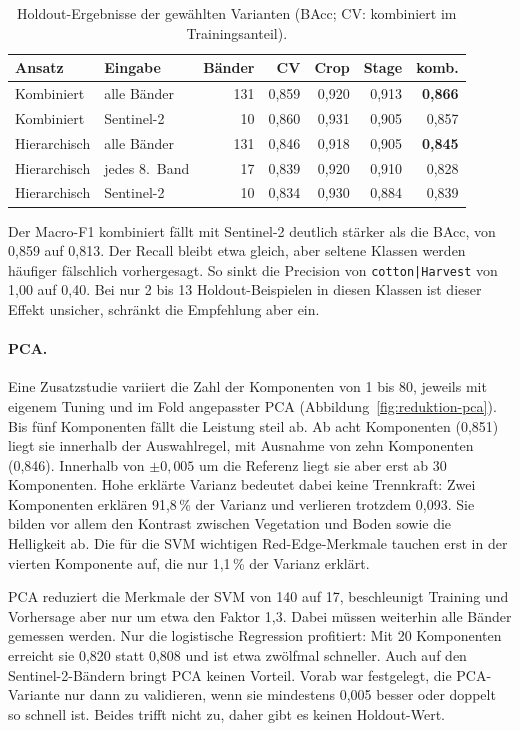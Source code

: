 \documentclass[11pt,a4paper,titlepage]{article}
\begin{document}
\begin{table}[H]
\centering
\caption{Holdout-Ergebnisse der gew\"ahlten Varianten (BAcc; CV: kombiniert
im Trainingsanteil).}
\label{tab:reduktion-validierung}
\small
\begin{tabularx}{\linewidth}{@{}lXrrrrr@{}}
	\toprule
	Ansatz & Eingabe & B\"ander & CV & Crop & Stage & komb. \\
	\midrule
	Kombiniert & alle B\"ander & 131 & 0,859 & 0,920 & 0,913 & \textbf{0,866} \\
	Kombiniert & Sentinel-2 & 10 & 0,860 & 0,931 & 0,905 & 0,857 \\
	\midrule
	Hierarchisch & alle B\"ander & 131 & 0,846 & 0,918 & 0,905 & \textbf{0,845} \\
	Hierarchisch & jedes 8.~Band & 17 & 0,839 & 0,920 & 0,910 & 0,828 \\
	Hierarchisch & Sentinel-2 & 10 & 0,834 & 0,930 & 0,884 & 0,839 \\
	\bottomrule
\end{tabularx}
\end{table}

Der Macro-F1 kombiniert f\"allt mit Sentinel-2 deutlich st\"arker als die
BAcc, von 0,859 auf 0,813. Der Recall bleibt etwa gleich, aber seltene
Klassen werden h\"aufiger f\"alschlich vorhergesagt. So sinkt die Precision
von \texttt{cotton|Harvest} von 1,00 auf 0,40. Bei nur 2 bis 13
Holdout-Beispielen in diesen Klassen ist dieser Effekt unsicher, schr\"ankt
die Empfehlung aber ein.

\paragraph{PCA.}
Eine Zusatzstudie variiert die Zahl der Komponenten von 1 bis 80, jeweils
mit eigenem Tuning und im Fold angepasster PCA
(Abbildung~\ref{fig:reduktion-pca}). Bis f\"unf Komponenten f\"allt die
Leistung steil ab. Ab acht Komponenten (0,851) liegt sie innerhalb der Auswahlregel, mit
Ausnahme von zehn Komponenten (0,846). Innerhalb von $\pm 0{,}005$ um die Referenz liegt sie aber erst ab
30 Komponenten. Hohe erkl\"arte Varianz bedeutet dabei keine Trennkraft:
Zwei Komponenten erkl\"aren 91,8\,\% der Varianz und verlieren trotzdem
0,093. Sie bilden vor allem den Kontrast zwischen Vegetation und Boden
sowie die Helligkeit ab. Die f\"ur die SVM wichtigen Red-Edge-Merkmale
tauchen erst in der vierten Komponente auf, die nur 1,1\,\% der Varianz
erkl\"art.

PCA reduziert die Merkmale der SVM von 140 auf 17, beschleunigt Training
und Vorhersage aber nur um etwa den Faktor 1,3. Dabei m\"ussen weiterhin
alle B\"ander gemessen werden. Nur die logistische Regression profitiert:
Mit 20 Komponenten erreicht sie 0,820 statt 0,808 und ist etwa zw\"olfmal
schneller. Auch auf den Sentinel-2-B\"andern bringt PCA keinen Vorteil. Vorab
war festgelegt, die PCA-Variante nur dann zu validieren, wenn sie mindestens
0,005 besser oder doppelt so schnell ist. Beides trifft nicht zu, daher gibt
es keinen Holdout-Wert.
\end{document}
